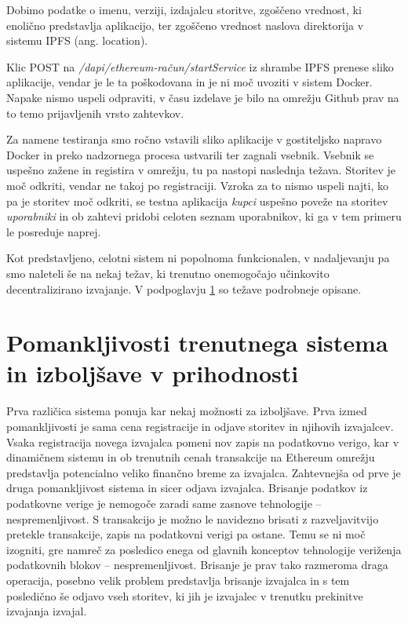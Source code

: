 \documentclass[a4paper, 12pt]{book}
\begin{document}
Dobimo podatke o imenu, verziji, izdajalcu storitve, zgoščeno vrednost, ki enolično predstavlja aplikacijo, ter zgoščeno vrednost naslova direktorija v sistemu IPFS (ang. location).

Klic POST na \textit{/dapi/{ethereum-račun}/startService} iz shrambe IPFS prenese sliko aplikacije, vendar je le ta poškodovana in je ni moč uvoziti v sistem Docker.
Napake nismo uspeli odpraviti, v času izdelave je bilo na omrežju Github prav na to temo prijavljenih vrsto zahtevkov.

Za namene testiranja smo ročno vstavili sliko aplikacije v gostiteljsko napravo Docker in preko nadzornega procesa ustvarili ter zagnali vsebnik.
Vsebnik se uspešno zažene in registira v omrežju, tu pa nastopi naslednja težava.
Storitev je moč odkriti, vendar ne takoj po registraciji.
Vzroka za to nismo uspeli najti, ko pa je storitev moč odkriti, se testna aplikacija \textit{kupci} uspešno poveže na storitev \textit{uporabniki} in ob zahtevi pridobi celoten seznam uporabnikov, ki ga v tem primeru le posreduje naprej.

Kot predstavljeno, celotni sistem ni popolnoma funkcionalen, v nadaljevanju pa smo naleteli še na nekaj težav, ki trenutno onemogočajo učinkovito decentralizirano izvajanje.
V podpoglavju \ref{improvments} so težave podrobneje opisane.


\section{Pomankljivosti trenutnega sistema in izboljšave v prihodnosti}
\label{improvments}

Prva različica sistema ponuja kar nekaj možnosti za izboljšave.
Prva izmed pomankljivosti je sama cena registracije in odjave storitev in njihovih izvajalcev.
Vsaka registracija novega izvajalca pomeni nov zapis na podatkovno verigo, kar v dinamičnem sistemu in ob trenutnih cenah transakcije na Ethereum omrežju predstavlja potencialno veliko finančno breme za izvajalca.
Zahtevnejša od prve je druga pomankljivost sistema in sicer odjava izvajalca.
Brisanje podatkov iz podatkovne verige je nemogoče zaradi same zasnove tehnologije -- nespremenljivost.
S transakcijo je možno le navidezno brisati z razveljavitvijo pretekle transakcije, zapis na podatkovni verigi pa ostane.
Temu se ni moč izogniti, gre namreč za posledico enega od glavnih konceptov tehnologije veriženja podatkovnih blokov -- nespremenljivost.
Brisanje je prav tako razmeroma draga operacija, posebno velik problem predstavlja brisanje izvajalca in s tem posledično še odjavo vseh storitev, ki jih je izvajalec v trenutku prekinitve izvajanja izvajal.
\end{document}
